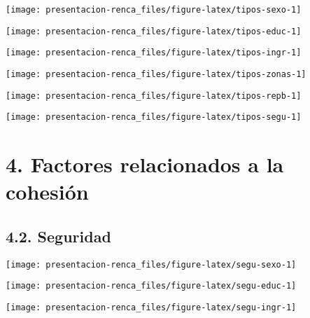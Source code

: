 \documentclass[
]{article}
\begin{document}
\begin{flushleft}\texttt{[image: presentacion-renca\_files/figure-latex/tipos-sexo-1]} \end{flushleft}

\begin{flushleft}\texttt{[image: presentacion-renca\_files/figure-latex/tipos-educ-1]} \end{flushleft}

\begin{flushleft}\texttt{[image: presentacion-renca\_files/figure-latex/tipos-ingr-1]} \end{flushleft}

\begin{flushleft}\texttt{[image: presentacion-renca\_files/figure-latex/tipos-zonas-1]} \end{flushleft}

\begin{flushleft}\texttt{[image: presentacion-renca\_files/figure-latex/tipos-repb-1]} \end{flushleft}

\begin{flushleft}\texttt{[image: presentacion-renca\_files/figure-latex/tipos-segu-1]} \end{flushleft}

\hypertarget{factores-relacionados-a-la-cohesiuxf3n}{%
\section{4. Factores relacionados a la
cohesión}\label{factores-relacionados-a-la-cohesiuxf3n}}

\hypertarget{seguridad}{%
\subsection{4.2. Seguridad}\label{seguridad}}

\begin{flushleft}\texttt{[image: presentacion-renca\_files/figure-latex/segu-sexo-1]} \end{flushleft}

\begin{flushleft}\texttt{[image: presentacion-renca\_files/figure-latex/segu-educ-1]} \end{flushleft}

\begin{flushleft}\texttt{[image: presentacion-renca\_files/figure-latex/segu-ingr-1]} \end{flushleft}
\end{document}
